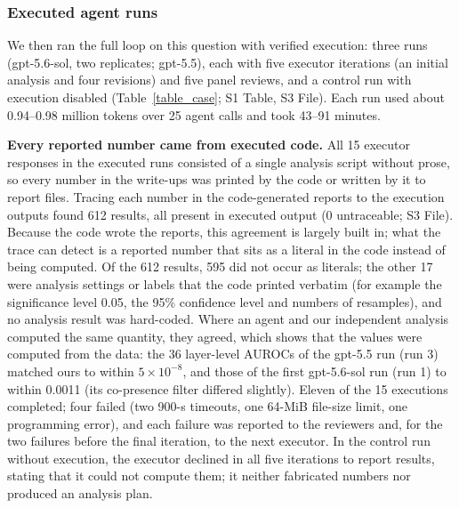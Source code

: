 \subsubsection*{Executed agent runs}

We then ran the full loop on this question with verified execution: three runs (gpt-5.6-sol, two replicates; gpt-5.5), each with five executor iterations (an initial analysis and four revisions) and five panel reviews, and a control run with execution disabled (Table~\ref{table_case}; S1 Table, S3 File). Each run used about 0.94--0.98 million tokens over 25 agent calls and took 43--91 minutes.

\textbf{Every reported number came from executed code.} All 15 executor responses in the executed runs consisted of a single analysis script without prose, so every number in the write-ups was printed by the code or written by it to report files. Tracing each number in the code-generated reports to the execution outputs found 612 results, all present in executed output (0 untraceable; S3 File). Because the code wrote the reports, this agreement is largely built in; what the trace can detect is a reported number that sits as a literal in the code instead of being computed. Of the 612 results, 595 did not occur as literals; the other 17 were analysis settings or labels that the code printed verbatim (for example the significance level 0.05, the 95\% confidence level and numbers of resamples), and no analysis result was hard-coded. Where an agent and our independent analysis computed the same quantity, they agreed, which shows that the values were computed from the data: the 36 layer-level AUROCs of the gpt-5.5 run (run 3) matched ours to within $5\times10^{-8}$, and those of the first gpt-5.6-sol run (run 1) to within 0.0011 (its co-presence filter differed slightly). Eleven of the 15 executions completed; four failed (two 900-s timeouts, one 64-MiB file-size limit, one programming error), and each failure was reported to the reviewers and, for the two failures before the final iteration, to the next executor. In the control run without execution, the executor declined in all five iterations to report results, stating that it could not compute them; it neither fabricated numbers nor produced an analysis plan.

